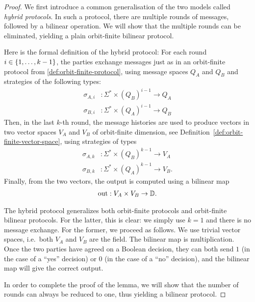 \begin{proof}
    We first introduce a common generalisation of the two models called \emph{hybrid protocols}. In such a protocol, there are multiple rounds of messages, 
    followed by a bilinear operation. We will show that the multiple rounds can be eliminated,
    yielding a plain orbit-finite bilinear protocol. 
    
    Here is the formal definition of the hybrid protocol: For each round $i \in \{1, \ldots, k-1\}$, the parties exchange messages just as in an orbit-finite
    protocol from \cref{def:orbit-finite-protocol}, using message spaces $Q_A$ and $Q_B$ and strategies of the following types: 
        \begin{align*}
        \sigma_{A,i} & : \Sigma^* \times (Q_B)^{i-1} \to Q_A\\
        \sigma_{B,i} & : \Sigma^* \times (Q_A)^{i-1} \to Q_B
        \end{align*}
    Then, in  the last $k$-th round, the message histories are used to produce vectors in two vector spaces $V_A$ and $V_B$ of orbit-finite dimension, see Definition~\ref{def:orbit-finite-vector-space}, using strategies 
    of types
    \begin{align*}
        \sigma_{A,k} & : \Sigma^* \times (Q_B)^{k-1} \to V_A\\
        \sigma_{B,k} & : \Sigma^* \times (Q_A)^{k-1} \to V_B.
        \end{align*}
    Finally, from the two vectors, the output is computed using a bilinear map
    \begin{align*}
        \text{out} : V_A \times V_B \to \mathbb D.
    \end{align*}
    

    The hybrid protocol generalizes both orbit-finite protocols and orbit-finite bilinear protocols. For the latter, this is clear: we simply use $k=1$ and there is no message exchange. For the former, we proceed as follows. We use  trivial vector spaces, i.e.~both $V_A$ and $V_B$ are the field. The bilinear map is multiplication. Once the two parties have agreed on a Boolean decision, they can both send $1$ (in the case of a ``yes'' decision) or $0$ (in the case of a ``no'' decision), and the bilinear map will give the correct output. 
    
    In order to complete the proof of the lemma, we will show that the number of rounds can always be reduced to one, thus yielding a bilinear protocol. 


\end{proof}
